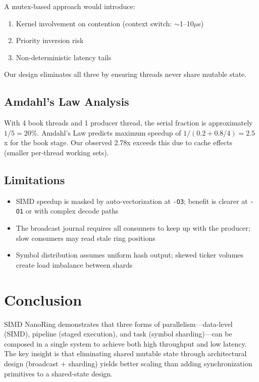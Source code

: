 \documentclass[conference]{IEEEtran}
\begin{document}
A mutex-based approach would introduce:
\begin{enumerate}
    \item Kernel involvement on contention (context switch: $\sim$1--10$\mu$s)
    \item Priority inversion risk
    \item Non-deterministic latency tails
\end{enumerate}

Our design eliminates all three by ensuring threads never share mutable state.

\subsection{Amdahl's Law Analysis}

With 4 book threads and 1 producer thread, the serial fraction is approximately $1/5 = 20\%$. Amdahl's Law predicts maximum speedup of $1/(0.2 + 0.8/4) = 2.5$x for the book stage. Our observed 2.78x exceeds this due to cache effects (smaller per-thread working sets).

\subsection{Limitations}

\begin{itemize}
    \item SIMD speedup is masked by auto-vectorization at \texttt{-O3}; benefit is clearer at \texttt{-O1} or with complex decode paths
    \item The broadcast journal requires all consumers to keep up with the producer; slow consumers may read stale ring positions
    \item Symbol distribution assumes uniform hash output; skewed ticker volumes create load imbalance between shards
\end{itemize}

\section{Conclusion}

SIMD NanoRing demonstrates that three forms of parallelism---data-level (SIMD), pipeline (staged execution), and task (symbol sharding)---can be composed in a single system to achieve both high throughput and low latency. The key insight is that eliminating shared mutable state through architectural design (broadcast + sharding) yields better scaling than adding synchronization primitives to a shared-state design.
\end{document}
